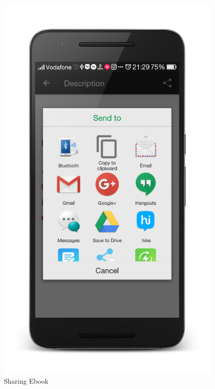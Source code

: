 \begin{figure}[ht]
\centering
\includegraphics[scale=0.13]{images/d17.png}
\caption{Sharing Ebook}
\end{figure}

\newpage

